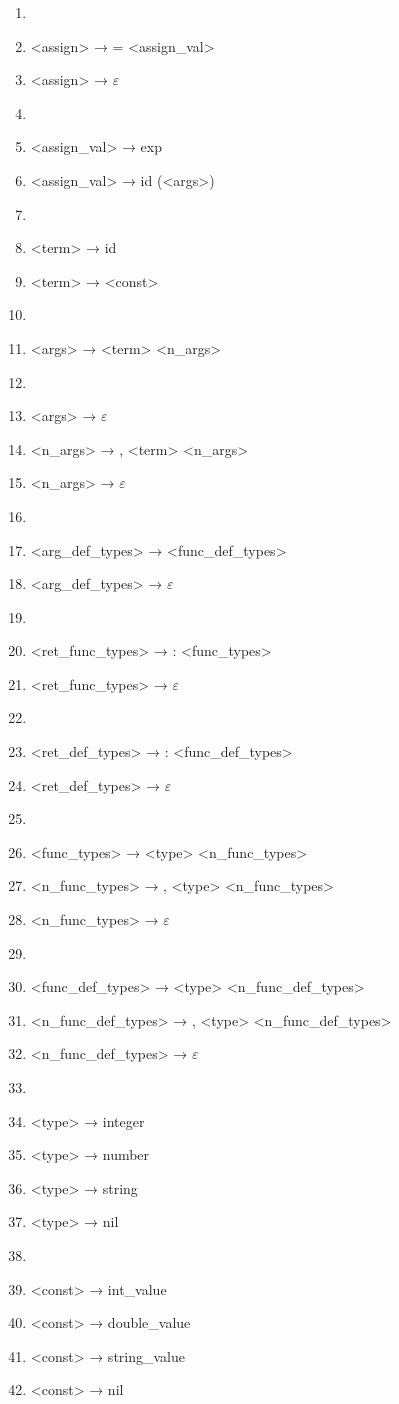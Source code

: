 \documentclass[a4paper, 12pt]{article}
\begin{document}
\begin{enumerate}
    \item[]
    \item <assign> → = <assign\_val>
    \item <assign> → $\varepsilon$
    \item[]
    \item <assign\_val> → exp
    \item <assign\_val> → id (<args>)
    \item[]
    \item <term> → id
    \item <term> → <const>
    \item[]
    \item <args> → <term> <n\_args>
    \item[]
    \item <args> → $\varepsilon$
    \item <n\_args> → , <term> <n\_args>
    \item <n\_args> → $\varepsilon$
    \item[]
    \item <arg\_def\_types> → <func\_def\_types>
    \item <arg\_def\_types> → $\varepsilon$
    \item[]
    \item <ret\_func\_types> → : <func\_types>
    \item <ret\_func\_types> → $\varepsilon$
    \item[]
    \item <ret\_def\_types> → : <func\_def\_types>
    \item <ret\_def\_types> → $\varepsilon$
    \item[]
    \item <func\_types> → <type>  <n\_func\_types>
    \item <n\_func\_types> → , <type>  <n\_func\_types>
    \item <n\_func\_types> → $\varepsilon$
    \item[]
    \item <func\_def\_types> → <type>  <n\_func\_def\_types>
    \item <n\_func\_def\_types> → , <type>  <n\_func\_def\_types>
    \item <n\_func\_def\_types> → $\varepsilon$
    \item[]
    \item <type> → integer
    \item <type> → number
    \item <type> → string
    \item <type> → nil
    \item[]
    \item <const> → int\_value
    \item <const> → double\_value
    \item <const> → string\_value
    \item <const> → nil
\end{enumerate}
\end{document}
